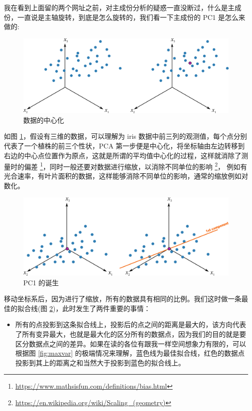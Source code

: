 \documentclass[
]{krantz}
\providecommand{\tightlist}{%
  \setlength{\itemsep}{0pt}\setlength{\parskip}{0pt}}
\begin{document}
我在看到上面留的两个网址之前，对主成份分析的疑惑一直没断过，什么是主成份，一直说是主轴旋转，到底是怎么旋转的，我们看一下主成份的 PC1 是怎么来做的:

\begin{figure}
\includegraphics[width=1\linewidth]{images/pc1} \caption{数据的中心化}\label{fig:pccenter}
\end{figure}

如图 \ref{fig:pccenter}，假设有三维的数据，可以理解为 iris 数据中前三列的观测值，每个点分别代表了一个植株的前三个性状，PCA 第一步便是中心化，将坐标轴由左边转移到右边的中心点位置作为原点，这就是所谓的平均值中心化的过程，这样就消除了测量时的偏差 \footnote{\url{https://www.mathsisfun.com/definitions/bias.html}}，同时一般还要对数据进行缩放，以消除不同单位的影响 \footnote{\url{https://en.wikipedia.org/wiki/Scaling_(geometry)}}，
例如有光合速率，有叶片面积的数据，这样能够消除不同单位的影响，通常的缩放例如对数化。

\begin{figure}
\includegraphics[width=1\linewidth]{images/pc2} \caption{PC1 的诞生}\label{fig:pc2}
\end{figure}

移动坐标系后，因为进行了缩放，所有的数据具有相同的比例。我们这时做一条最佳的拟合线(图 \ref{fig:pc2})，此时发生了两件重要的事情：

\begin{itemize}
\tightlist
\item
  所有的点投影到这条拟合线上，投影后的点之间的距离是最大的，该方向代表了所有变异最大，也就是最大化的区分所有的数据点，因为我们的目的就是要区分数据点之间的差异。如果在读的各位有跟我一样空间想象力有限的，可以根据图 \ref{fig:maxvar} 的极端情况来理解，蓝色线为最佳拟合线，红色的数据点投影到其上的距离之和当然大于投影到蓝色的拟合线上。
\end{itemize}
\end{document}
